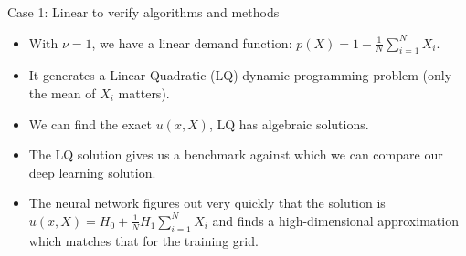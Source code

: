 \documentclass[aspectratio=169,10pt]{beamer}
\begin{document}
			
			\begin{frame}{Case 1: Linear to verify algorithms and methods}
			
			\begin{itemize}
			
			\item With $\nu=1$, we have a linear demand function:  $p(X) = 1 -  \frac{1}{N}\sum_{i=1}^N X_i$.\vspace{0.1in}
			
			\item It generates a Linear-Quadratic (LQ) dynamic programming problem (only the mean of $X_i$ matters).\vspace{0.1in}
			
			\item We can find the exact $u(x, X)$, LQ has algebraic solutions.\vspace{0.1in}
			
			\item The LQ solution gives us a benchmark against which we can compare our deep learning solution.\vspace{0.1in}
			
			\item The neural network figures out very quickly that the solution is $u(x, X) = H_0 +\frac{1}{N}H_1\sum_{i=1}^N X_i$ and finds a high-dimensional approximation which matches that for the training grid.\vspace{0.1in}
			
			
			
			\end{itemize}
			
			\end{frame}
			
\end{document}
